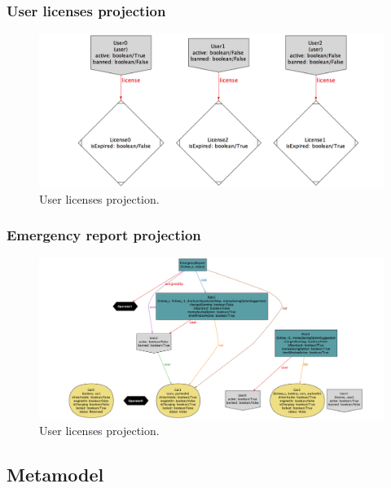 \begin{landscape}
		\subsubsection{User licenses projection}
			\begin{figure}	
				\includegraphics[width=2\textwidth, center]{img/user_licenses.png}
				\caption{User licenses projection.}
				\label{figure 3}
			\end{figure}
		
		\subsubsection{Emergency report projection}
			\begin{figure}	
				\includegraphics[width=2\textwidth, center]{img/emergency_reports.png}
				\caption{User licenses projection.}
				\label{figure 3}
			\end{figure}
	
	\subsection{Metamodel}
	\end{landscape}